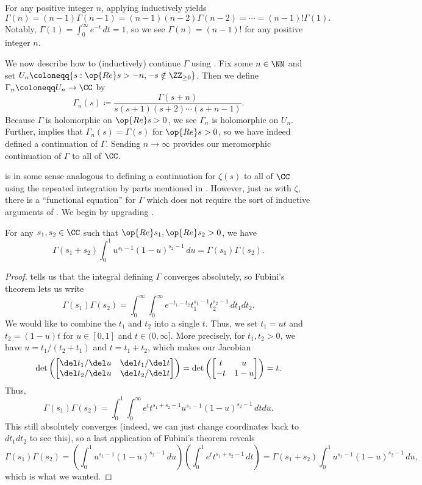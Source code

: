 \documentclass[../notes.tex]{subfiles}
\begin{document}
\begin{example} \label{ex:gamma-on-positive-integers}
	For any positive integer $n$, applying  inductively yields
	\[\Gamma(n)=(n-1)\Gamma(n-1)=(n-1)(n-2)\Gamma(n-2)=\cdots=(n-1)!\Gamma(1).\]
	Notably, $\Gamma(1)=\int_0^\infty e^{-t}\,dt=1$, so we see $\Gamma(n)=(n-1)!$ for any positive integer $n$.
\end{example}
\begin{remark} \label{rem:ind-continue-gamma}
	We now describe how to (inductively) continue $\Gamma$ using . Fix some $n\in\NN$ and set $U_n\coloneqq\{s:\op{Re}s>-n,-s\notin\ZZ_{\ge0}\}$. Then we define $\Gamma_n\coloneqq U_n\to\CC$ by
	\[\Gamma_n(s)\coloneqq\frac{\Gamma(s+n)}{s(s+1)(s+2)\cdots(s+n-1)}.\]
	Because $\Gamma$ is holomorphic on $\op{Re}s>0$, we see $\Gamma_n$ is holomorphic on $U_n$. Further,  implies that $\Gamma_n(s)=\Gamma(s)$ for $\op{Re}s>0$, so we have indeed defined a continuation of $\Gamma$. Sending $n\to\infty$ provides our meromorphic continuation of $\Gamma$ to all of $\CC$.
\end{remark}
 is in some sense analogous to defining a continuation for $\zeta(s)$ to all of $\CC$ using the repeated integration by parts mentioned in . However, just as with $\zeta$, there is a ``functional equation'' for $\Gamma$ which does not require the sort of inductive arguments of . We begin by upgrading .
\begin{lemma} \label{lem:add-gamma}
	For any $s_1,s_2\in\CC$ such that $\op{Re}s_1,\op{Re}s_2>0$, we have
	\[\Gamma(s_1+s_2)\int_0^1u^{s_1-1}(1-u)^{s_2-1}\,du=\Gamma(s_1)\Gamma(s_2).\]
\end{lemma}
\begin{proof}
	 tells us that the integral defining $\Gamma$ converges absolutely, so Fubini's theorem lets us write
	\[\Gamma(s_1)\Gamma(s_2)=\int_0^\infty\int_0^\infty e^{-t_1-t_2}t_1^{s_1-1}t_2^{s_2-1}\,dt_1dt_2.\]
	We would like to combine the $t_1$ and $t_2$ into a single $t$. Thus, we set $t_1=ut$ and $t_2=(1-u)t$ for $u\in[0,1]$ and $t\in(0,\infty]$. More precisely, for $t_1,t_2>0$, we have $u=t_1/(t_2+t_1)$ and $t=t_1+t_2$, which makes our Jacobian
	\[\det\left(\begin{bmatrix}
		\del t_1/\del u & \del t_1/\del t \\
		\del t_2/\del u & \del t_2/\del t
	\end{bmatrix}\right)=\det\left(\begin{bmatrix}
		t & u \\
		-t & 1-u
	\end{bmatrix}\right)=t.\]
	Thus,
	\[\Gamma(s_1)\Gamma(s_2)=\int_0^1\int_0^\infty e^tt^{s_1+s_2-1}u^{s_1-1}(1-u)^{s_2-1}\,dtdu.\]
	This still absolutely converges (indeed, we can just change coordinates back to $dt_1dt_2$ to see this), so a last application of Fubini's theorem reveals
	\[\Gamma(s_1)\Gamma(s_2)=\left(\int_0^1u^{s_1-1}(1-u)^{s_2-1}\,du\right)\left(\int_0^1e^tt^{s_1+s_2-1}\,dt\right)=\Gamma(s_1+s_2)\int_0^1u^{s_1-1}(1-u)^{s_2-1}\,du,\]
	which is what we wanted.
\end{proof}
\end{document}
